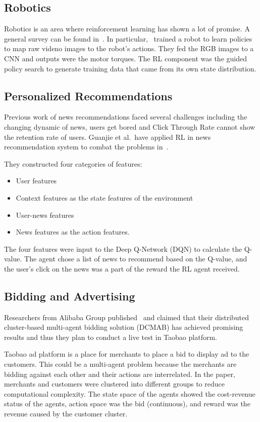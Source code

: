 \documentclass[letterpaper, 10 pt]{IEEEconf}
\begin{document}
\subsection{Robotics}

Robotics is an area where reinforcement learning has shown a lot of
promise. A general survey can be found
in~\cite{kober2013reinforcement}. In particular,~\cite{levine2016end}
trained a robot to learn policies to map raw videno images to the
robot’s actions. They fed the RGB images to a CNN and outputs were the
motor torques. The RL component was the guided policy search to
generate training data that came from its own state distribution.

\subsection{Personalized Recommendations}

Previous work of news recommendations faced several challenges
including the changing dynamic of news, users get bored and Click
Through Rate cannot show the retention rate of users. Guanjie et
al.~have applied RL in news recommendation system to combat the
problems in~\cite{zheng2018drn}.

They constructed four categories of
features:
\begin{itemize}
	\item User features
	\item Context features as the state features of the environment
	\item User-news features
	\item News features as the action features.
\end{itemize}

The four features were input to the Deep Q-Network (DQN) to calculate
the Q-value. The agent chose a list of news to recommend based on the
Q-value, and the user’s click on the news was a part of the reward the
RL agent received.

\subsection{Bidding and Advertising}

Researchers from Alibaba Group published~\cite{jin2018real} and
claimed that their distributed cluster-based multi-agent bidding
solution (DCMAB) has achieved promising results and thus they plan to
conduct a live test in Taobao platform.

Taobao ad platform is a place for merchants to place a bid
to display ad to the customers. This could be a multi-agent problem
because the merchants are bidding against each other and their actions
are interrelated. In the paper, merchants and customers were clustered
into different groups to reduce computational complexity. The state
space of the agents showed the cost-revenue status of the agents,
action space was the bid (continuous), and reward was the revenue
caused by the customer cluster.
\end{document}
